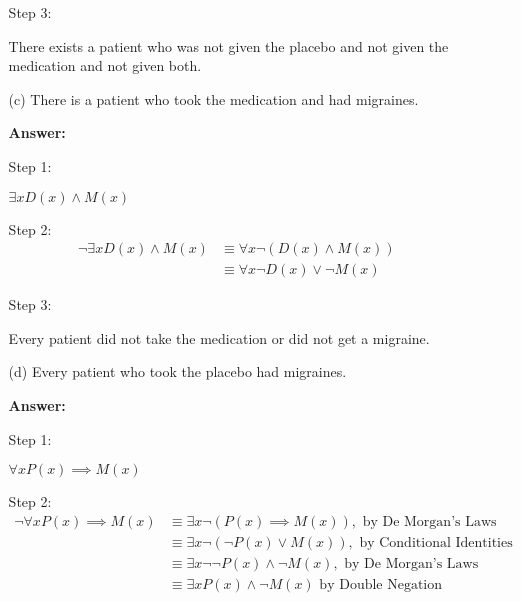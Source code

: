 \documentclass[12pt]{extreport}
\newcommand{\answer}[0]{\medskip \textbf{Answer:} \medskip}
\begin{document}
\begin{enumerate}
\begin{enumerate}
                \medskip

                Step 3:

                There exists a patient who was not given the placebo and not given the medication and not given both.

            \item[(c)] There is a patient who took the medication and had migraines.
            
                \answer

                Step 1: 

                \( \exists x D(x) \land M(x) \)

                \medskip

                Step 2:
                \begin{align*}
                    \neg \exists x D(x) \land M(x) &\equiv \forall x \neg (D(x) \land M(x)) \\
                                                   &\equiv \forall x \neg D(x) \lor \neg M(x)
                \end{align*}

                \medskip
                
                Step 3:

                Every patient did not take the medication or did not get a migraine.

            \item[(d)] Every patient who took the placebo had migraines.

                \answer

                Step 1:

                \( \forall x P(x) \implies M(x) \)

                \medskip

                Step 2:
                \begin{align*}
                    \neg \forall x P(x) \implies M(x) &\equiv \exists x \neg (P(x) \implies M(x)), \text{ by De Morgan's Laws} \\
                                                      &\equiv \exists x \neg (\neg P(x) \lor M(x)), \text{ by Conditional Identities} \\
                                                      &\equiv \exists x \neg \neg P(x) \land \neg M(x), \text{ by De Morgan's Laws} \\
                                                      &\equiv \exists x P(x) \land \neg M(x) \text{ by Double Negation}
                \end{align*}


\end{enumerate}
\end{enumerate}
\end{document}

